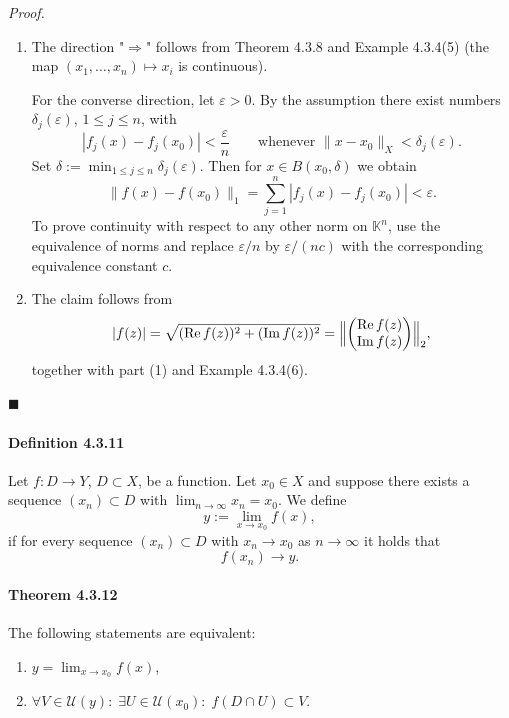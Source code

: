 \documentclass[12pt]{article}
\begin{document}
\emph{Proof.}
\begin{enumerate}[label=({\arabic*})]
	\item The direction "${\Rightarrow}$" follows from Theorem 4.3.8 and Example 4.3.4(5) (the map $(x_1,\dots,x_n) \mapsto x_i$ is continuous).

	For the converse direction, let $\varepsilon > 0$. By the assumption there exist numbers $\delta_j(\varepsilon)$, $1 \le j \le n$, with
	\[
		|f_j(x) - f_j(x_0)| < \frac{\varepsilon}{n} \qquad \text{whenever } \|x - x_0\|_X < \delta_j(\varepsilon).
	\]
	Set $\delta := \min_{1\le j\le n} \delta_j(\varepsilon)$. Then for $x \in B(x_0,\delta)$ we obtain
	\[
		\|f(x) - f(x_0)\|_1 = \sum_{j=1}^{n} |f_j(x) - f_j(x_0)| < \varepsilon.
	\]
	To prove continuity with respect to any other norm on $\mathbb K^n$, use the equivalence of norms and replace $\varepsilon/n$ by $\varepsilon/(nc)$ with the corresponding equivalence constant $c$.

	\item The claim follows from
	\[
		|f(z)| = \sqrt{(\operatorname{Re} f(z))^2 + (\operatorname{Im} f(z))^2} = \Bigl\|\begin{pmatrix} \operatorname{Re} f(z) \\ \operatorname{Im} f(z) \end{pmatrix}\Bigr\|_2,
	\]
	together with part (1) and Example 4.3.4(6).
\end{enumerate}

\hfill $\blacksquare$

\paragraph{Definition 4.3.11} Let $f : D \to Y$, $D \subset X$, be a function. Let $x_0 \in X$ and suppose there exists a sequence $(x_n) \subset D$ with $\lim_{n\to\infty} x_n = x_0$. We define
\[
	y := \lim_{x\to x_0} f(x),
\]
if for every sequence $(x_n) \subset D$ with $x_n \to x_0$ as $n \to \infty$ it holds that
\[
	f(x_n) \longrightarrow y.
\]

\paragraph{Theorem 4.3.12} The following statements are equivalent:
\begin{enumerate}[label=({\arabic*})]
	\item $y = \lim_{x\to x_0} f(x)$,
	\item $\forall V \in \mathcal U(y):\; \exists U \in \mathcal U(x_0):\; f(D \cap U) \subset V$.
\end{enumerate}
\end{document}
